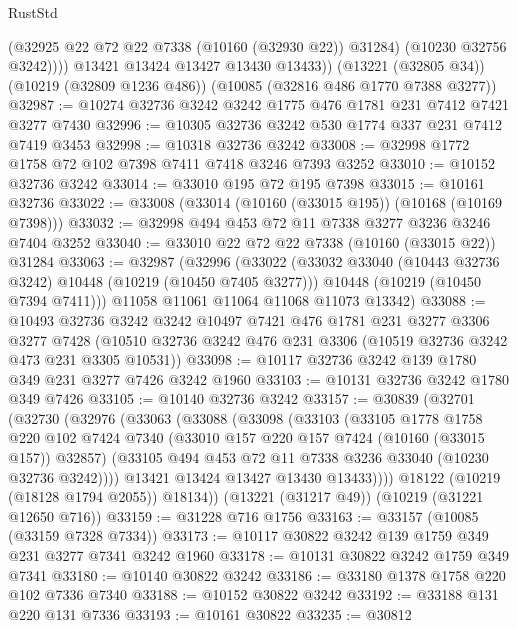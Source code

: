 \begin{lexlean}{RustStd}
\begin{coremodule}
              (@32925 @22 @72 @22 @7338 (@10160 (@32930 @22)) @31284)
              (@10230 @32756 @3242))))
        @13421
        @13424
        @13427
        @13430
        @13433))
    (@13221 (@32805 @34))
    (@10219 (@32809 @1236 @486))
    (@10085 (@32816 @486 @1770 @7388 @3277))
@32987 := @10274 @32736 @3242 @3242 @1775 @476 @1781 @231 @7412 @7421 @3277 @7430
@32996 := @10305 @32736 @3242 @530 @1774 @337 @231 @7412 @7419 @3453
@32998 := @10318 @32736 @3242
@33008 := @32998 @1772 @1758 @72 @102 @7398 @7411 @7418 @3246 @7393 @3252
@33010 := @10152 @32736 @3242
@33014 := @33010 @195 @72 @195 @7398
@33015 := @10161 @32736
@33022 := @33008 (@33014 (@10160 (@33015 @195)) (@10168 (@10169 @7398)))
@33032 := @32998 @494 @453 @72 @11 @7338 @3277 @3236 @3246 @7404 @3252
@33040 := @33010 @22 @72 @22 @7338 (@10160 (@33015 @22)) @31284
@33063 := @32987
    (@32996
      (@33022
        (@33032 @33040 (@10443 @32736 @3242) @10448 (@10219 (@10450 @7405 @3277)))
        @10448
        (@10219 (@10450 @7394 @7411)))
      @11058
      @11061
      @11064
      @11068
      @11073
      @13342)
@33088 := @10493
    @32736
    @3242
    @3242
    @10497
    @7421
    @476
    @1781
    @231
    @3277
    @3306
    @3277
    @7428
    (@10510 @32736 @3242 @476 @231 @3306 (@10519 @32736 @3242 @473 @231 @3305 @10531))
@33098 := @10117 @32736 @3242 @139 @1780 @349 @231 @3277 @7426 @3242 @1960
@33103 := @10131 @32736 @3242 @1780 @349 @7426
@33105 := @10140 @32736 @3242
@33157 := @30839
    (@32701
      (@32730
        (@32976
          (@33063
            (@33088
              (@33098
                (@33103
                  (@33105
                    @1778
                    @1758
                    @220
                    @102
                    @7424
                    @7340
                    (@33010 @157 @220 @157 @7424 (@10160 (@33015 @157)) @32857)
                    (@33105 @494 @453 @72 @11 @7338 @3236 @33040 (@10230 @32736 @3242))))
                @13421
                @13424
                @13427
                @13430
                @13433))))
        @18122
        (@10219 (@18128 @1794 @2055))
        @18134))
    (@13221 (@31217 @49))
    (@10219 (@31221 @12650 @716))
@33159 := @31228 @716 @1756
@33163 := @33157 (@10085 (@33159 @7328 @7334))
@33173 := @10117 @30822 @3242 @139 @1759 @349 @231 @3277 @7341 @3242 @1960
@33178 := @10131 @30822 @3242 @1759 @349 @7341
@33180 := @10140 @30822 @3242
@33186 := @33180 @1378 @1758 @220 @102 @7336 @7340
@33188 := @10152 @30822 @3242
@33192 := @33188 @131 @220 @131 @7336
@33193 := @10161 @30822
@33235 := @30812

\end{coremodule}
\end{lexlean}
